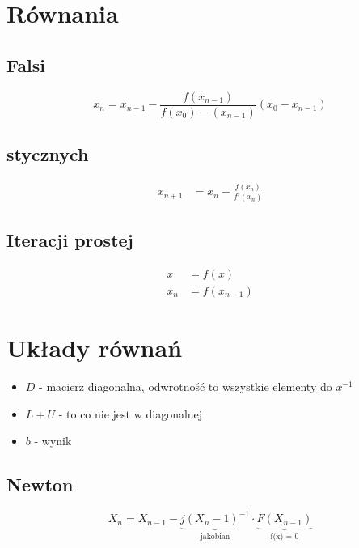 \documentclass[a5paper,10pt]{article}
\begin{document}
\begin{multicols}{2}
    \section{Równania}

    \subsection{Falsi}

    \[
        x_n = x_{n-1} - \frac{f\left( x_{n-1} \right)}{f\left( x_0 \right) -
        \left( x_{n-1} \right)} \left( x_0 - x_{n-1} \right)
    \]

    \subsection{stycznych}

    \begin{align*}
        x_{n+1} &= x_n - \frac{f\left( x_n \right)}{f'\left(x_n\right)}
    \end{align*}

    \subsection{Iteracji prostej}

    \begin{align*}
        x &= f\left( x \right) \\
        x_n &= f\left( x_{n-1} \right) 
    \end{align*}

    \section{Układy równań}
    \begin{itemize}
        \item $D$ - macierz diagonalna, odwrotność to wszystkie elementy do
            $x^{-1}$
        \item $L + U$ - to co nie jest w diagonalnej
        \item $b$ - wynik
    \end{itemize}

    \subsection{Newton}

    \[
        X_n = X_{n-1} - \underbrace{j\left( X_n-1
        \right)^{-1}}_{\text{jakobian}} \cdot
        \underbrace{F\left(X_{n-1}\right)}_{\text{f(x) = 0}}
    \]


\end{multicols}
\end{document}
